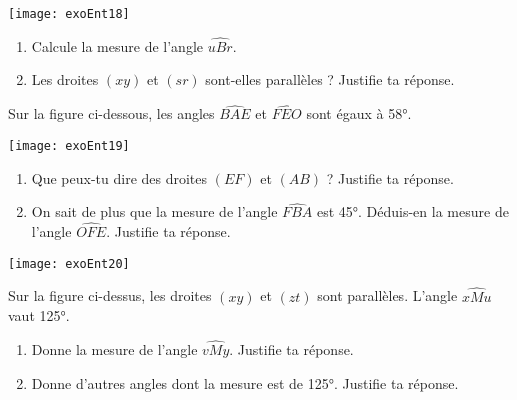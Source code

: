 \begin{exercice}

\begin{center}
    \texttt{[image: exoEnt18]}
\end{center}

\begin{enumerate}
\item Calcule la mesure de l'angle $\widehat{uBr}$.
\item Les droites $(xy)$ et $(sr)$ sont-elles parallèles ? Justifie ta réponse.
\end{enumerate}
\end{exercice}









\begin{exercice}[Parallèles ?]
Sur la figure ci-dessous, les angles $\widehat{BAE}$ et $\widehat{FEO}$ sont égaux à 58°.

\begin{center}
    \texttt{[image: exoEnt19]}
\end{center}

\begin{enumerate}
\item Que peux-tu dire des droites $(EF)$ et $(AB)$ ? Justifie ta réponse.
\item On sait de plus que la mesure de l'angle $\widehat{FBA}$ est 45°. Déduis-en la mesure de l'angle $\widehat{OFE}$. Justifie ta réponse.
\end{enumerate}
\end{exercice}


\begin{exercice}

\begin{center}
    \texttt{[image: exoEnt20]}
\end{center}

Sur la figure ci-dessus, les droites $(xy)$ et $(zt)$ sont parallèles. L'angle $\widehat{xMu}$ vaut 125°.
\begin{enumerate}
\item Donne la mesure de l'angle $\widehat{vMy}$. Justifie ta réponse.
\item Donne d'autres angles dont la mesure est de 125°. Justifie ta réponse.
\end{enumerate}
\end{exercice}


